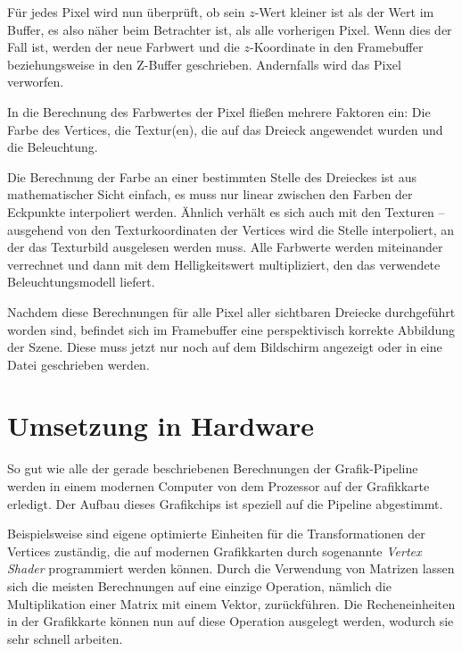 Für jedes Pixel wird nun überprüft, ob sein $z$-Wert kleiner ist als der Wert im Buffer, es also näher beim Betrachter ist, als alle vorherigen Pixel. Wenn dies der Fall ist, werden der neue Farbwert und die $z$-Koordinate in den Framebuffer beziehungsweise in den Z-Buffer geschrieben. Andernfalls wird das Pixel verworfen.

In die Berechnung des Farbwertes der Pixel fließen mehrere Faktoren ein: Die Farbe des Vertices, die Textur(en), die auf das Dreieck angewendet wurden und die Beleuchtung.

\label{lighting}
Die Berechnung der Farbe an einer bestimmten Stelle des Dreieckes ist aus mathematischer Sicht einfach, es muss nur linear zwischen den Farben der Eckpunkte interpoliert werden. Ähnlich verhält es sich auch mit den Texturen -- ausgehend von den Texturkoordinaten der Vertices wird die Stelle interpoliert, an der das Texturbild ausgelesen werden muss. Alle Farbwerte werden miteinander verrechnet und dann mit dem Helligkeitswert multipliziert, den das verwendete Beleuchtungsmodell liefert.


Nachdem diese Berechnungen für alle Pixel aller sichtbaren Dreiecke durchgeführt worden sind, befindet sich im Framebuffer eine perspektivisch korrekte Abbildung der Szene. Diese muss jetzt nur noch auf dem Bildschirm angezeigt oder in eine Datei geschrieben werden.

\section{Umsetzung in Hardware}
So gut wie alle der gerade beschriebenen Berechnungen der Grafik-Pipeline werden in einem modernen Computer von dem Prozessor auf der Grafikkarte erledigt. Der Aufbau dieses Grafikchips ist speziell auf die Pipeline abgestimmt.

Beispielsweise sind eigene optimierte Einheiten für die Transformationen der Vertices zuständig, die auf modernen Grafikkarten durch sogenannte \emph{Vertex Shader} programmiert werden können. Durch die Verwendung von Matrizen lassen sich die meisten Berechnungen auf eine einzige Operation, nämlich die Multiplikation einer Matrix mit einem Vektor, zurückführen. Die Recheneinheiten in der Grafikkarte können nun auf diese Operation ausgelegt werden, wodurch sie sehr schnell arbeiten.


